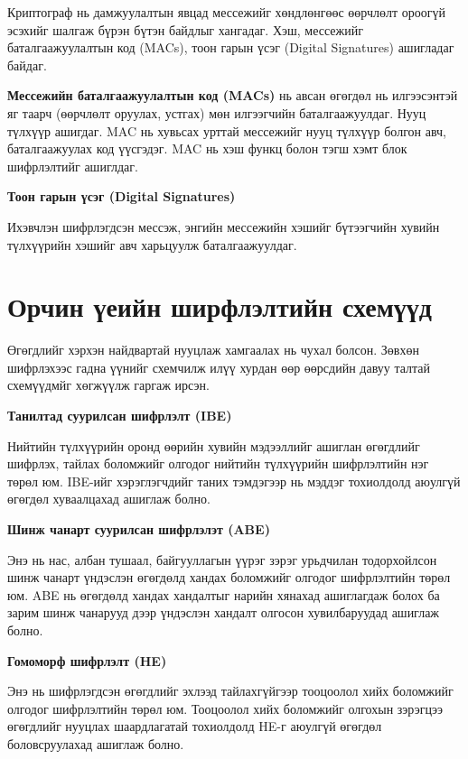 Криптограф нь дамжуулалтын явцад мессежийг хөндлөнгөөс өөрчлөлт ороогүй эсэхийг шалгаж бүрэн бүтэн байдлыг хангадаг. Хэш, мессежийг баталгаажуулалтын код (MACs), тоон гарын үсэг (Digital Signatures) ашигладаг байдаг.

\textbf{Мессежийн баталгаажуулалтын код (MACs)} нь авсан өгөгдөл нь илгээсэнтэй яг таарч (өөрчлөлт оруулах, устгах) мөн илгээгчийн баталгаажуулдаг.
Нууц түлхүүр ашигдаг. MAC нь хувьсах урттай мессежийг нууц түлхүүр болгон авч, баталгаажуулах код үүсгэдэг. MAC нь хэш функц болон тэгш хэмт блок шифрлэлтийг ашиглдаг.

\textbf{Тоон гарын үсэг (Digital Signatures)}

Ихэвчлэн шифрлэгдсэн мессэж, энгийн мессежийн хэшийг бүтээгчийн хувийн түлхүүрийн хэшийг авч харьцуулж баталгаажуулдаг.


\section{Орчин үеийн ширфлэлтийн схемүүд}
Өгөгдлийг хэрхэн найдвартай нууцлаж хамгаалах нь чухал болсон. Зөвхөн шифрлэхээс гадна үүнийг схемчилж илүү хурдан өөр өөрсдийн давуу талтай схемүүдмйг хөгжүүлж гаргаж ирсэн.

\textbf{Танилтад суурилсан шифрлэлт (IBE)} 

Нийтийн түлхүүрийн оронд өөрийн хувийн мэдээллийг ашиглан өгөгдлийг шифрлэх, тайлах боломжийг олгодог нийтийн түлхүүрийн шифрлэлтийн нэг төрөл юм. IBE-ийг хэрэглэгчдийг таних тэмдэгээр нь мэддэг тохиолдолд аюулгүй өгөгдөл хуваалцахад ашиглаж болно.

\textbf{Шинж чанарт суурилсан шифрлэлэт (ABE)}

Энэ нь нас, албан тушаал, байгууллагын үүрэг зэрэг урьдчилан тодорхойлсон шинж чанарт үндэслэн өгөгдөлд хандах боломжийг олгодог шифрлэлтийн төрөл юм. ABE нь өгөгдөлд хандах хандалтыг нарийн хянахад ашиглагдаж болох ба зарим шинж чанарууд дээр үндэслэн хандалт олгосон хувилбаруудад ашиглаж болно.

\textbf{Гомоморф шифрлэлт (HE)}

Энэ нь шифрлэгдсэн өгөгдлийг эхлээд тайлахгүйгээр тооцоолол хийх боломжийг олгодог шифрлэлтийн төрөл юм. Тооцоолол хийх боломжийг олгохын зэрэгцээ өгөгдлийг нууцлах шаардлагатай тохиолдолд HE-г аюулгүй өгөгдөл боловсруулахад ашиглаж болно.

